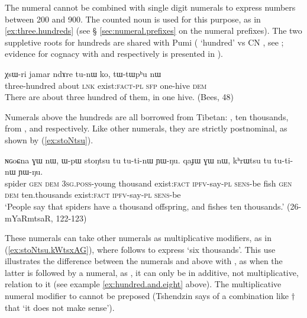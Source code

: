 The numeral  cannot be combined with single digit numerals to express numbers between 200 and 900. The counted noun  is used for this purpose, as in \ref{ex:three.hundreds} (see § \ref{sec:numeral.prefixes} on the numeral prefixes). The two suppletive roots for hundreds are shared with Pumi ( `hundred' vs CN , see \citealt[101]{daudey14grammar}; evidence for cognacy with  and  respectively is presented in \citealt{jacques17num}).

\begin{exe}
\ex \label{ex:three.hundreds}
\gll χsɯ-ri 	jamar 	ndɤre 	tu-nɯ 	ko, 	tɯ-tɯpʰu 	nɯ \\
three-hundred about \textsc{lnk} exist:\textsc{fact-pl} \textsc{sfp} one-hive \textsc{dem} \\
\glt There are about three hundred of them, in one hive. (Bees, 48)
\end{exe}
 
  Numerals above the hundreds are all borrowed from Tibetan: ,  {ten thousands},  from ,  and  respectively.  Like other numerals, they are strictly postnominal, as shown by (\ref{ex:stoNtsu}).


\begin{exe}
\ex \label{ex:stoNtsu}
\gll ɴɢoɕna ɣɯ nɯ, ɯ-pɯ stoŋtsu tu tu-ti-nɯ ɲɯ-ŋu. qaɟɯ ɣɯ nɯ, kʰrɯtsu tu tu-ti-nɯ ɲɯ-ŋu. \\
spider \textsc{gen} \textsc{dem} \textsc{3sg}.\textsc{poss}-young thousand exist:\textsc{fact} \textsc{ipfv}-say-\textsc{pl} \textsc{sens}-be fish \textsc{gen} \textsc{dem} ten.thousands exist:\textsc{fact} \textsc{ipfv}-say-\textsc{pl} \textsc{sens}-be  \\
\glt `People say that spiders have a thousand offspring, and fishes ten thousands.' (26-mYaRmtsaR, 122-123)
\end{exe}

These numerals can take other numerals as multiplicative modifiers, as in (\ref{ex:stoNtsu.kWtsxAG}), where  follows   to express `six thousands'. This use illustrates the difference between the numerals  and above with , as when the latter is followed by a numeral, as , it can only be in additive, not multiplicative, relation to it (see example \ref{ex:hundred.and.eight} above). The multiplicative numeral modifier to  cannot be preposed (Tshendzin says of a combination like $\dagger$ that  `it does not make sense').

